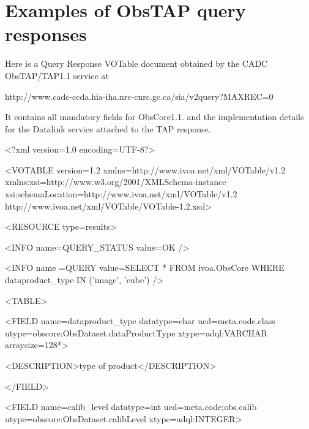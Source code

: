 \documentclass[11pt,a4paper]{ivoa}
\begin{document}
\section{Examples of ObsTAP query responses}
Here is a Query Response VOTable document obtained by the CADC ObsTAP/TAP1.1 service at  

http://www.cadc-ccda.hia-iha.nrc-cnrc.gc.ca/sia/v2query?MAXREC=0

It contains all mandatory fields for ObsCore1.1. and the implementation details for the Datalink service attached to the
TAP response. 

{\textless}?xml version={\textquotedbl}1.0{\textquotedbl} encoding={\textquotedbl}UTF-8{\textquotedbl}?{\textgreater}

{\textless}VOTABLE version={\textquotedbl}1.2{\textquotedbl}
xmlns={\textquotedbl}http://www.ivoa.net/xml/VOTable/v1.2{\textquotedbl}
xmlns:xsi={\textquotedbl}http://www.w3.org/2001/XMLSchema-instance{\textquotedbl}
xsi:schemaLocation={\textquotedbl}http://www.ivoa.net/xml/VOTable/v1.2
http://www.ivoa.net/xml/VOTable/VOTable-1.2.xsd{\textquotedbl}{\textgreater}

{\textless}RESOURCE type={\textquotedbl}results{\textquotedbl}{\textgreater}

{\textless}INFO name={\textquotedbl}QUERY\_STATUS{\textquotedbl} value={\textquotedbl}OK{\textquotedbl} /{\textgreater}

{\textless}INFO name ={\textquotedbl}QUERY{\textquotedbl} value={\textquotedbl}SELECT * FROM ivoa.ObsCore WHERE
dataproduct\_type IN ('image', 'cube'){\textquotedbl} /{\textgreater}

{\textless}TABLE{\textgreater}

{\textless}FIELD name={\textquotedbl}dataproduct\_type{\textquotedbl} datatype={\textquotedbl}char{\textquotedbl}
ucd={\textquotedbl}meta.code.class{\textquotedbl}
utype={\textquotedbl}obscore:ObsDataset.dataProductType{\textquotedbl} xtype={\textquotedbl}adql:VARCHAR{\textquotedbl}
arraysize={\textquotedbl}128*{\textquotedbl}{\textgreater}

{\textless}DESCRIPTION{\textgreater}type of product{\textless}/DESCRIPTION{\textgreater}

{\textless}/FIELD{\textgreater}

{\textless}FIELD name={\textquotedbl}calib\_level{\textquotedbl} datatype={\textquotedbl}int{\textquotedbl}
ucd={\textquotedbl}meta.code;obs.calib{\textquotedbl} utype={\textquotedbl}obscore:ObsDataset.calibLevel{\textquotedbl}
xtype={\textquotedbl}adql:INTEGER{\textquotedbl}{\textgreater}
\end{document}
